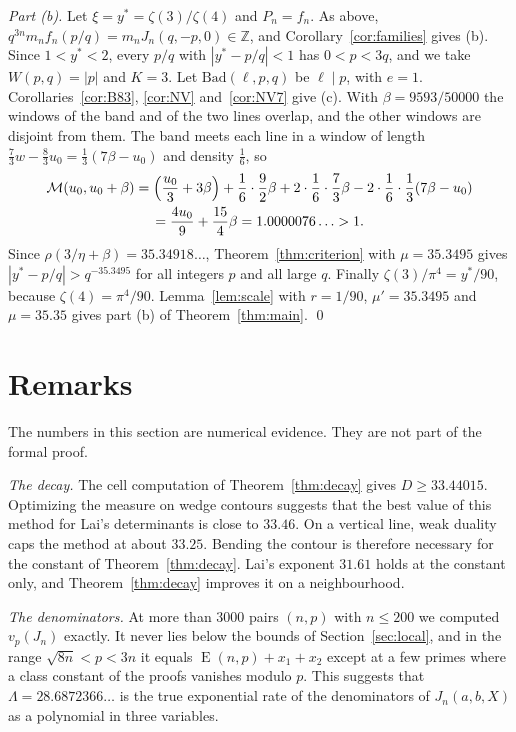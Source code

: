 \documentclass[11pt]{amsart}
\theoremstyle{definition}
\theoremstyle{remark}
\numberwithin{equation}{section}
\newcommand{\Z}{\mathbb Z}
\newcommand{\cM}{\mathcal M}
\newcommand{\Lex}{\operatorname{E}}
\begin{document}
\emph{Part (b).} Let $\xi=y^*=\zeta(3)/\zeta(4)$ and $P_n=f_n$. As above,
$q^{3n}m_nf_n(p/q)=m_nJ_n(q,-p,0)\in\Z$, and Corollary~\ref{cor:families} gives (b). Since $1<y^*<2$, every $p/q$
with $|y^*-p/q|<1$ has $0<p<3q$, and we take $W(p,q)=|p|$ and $K=3$. Let $\mathrm{Bad}(\ell,p,q)$ be $\ell\mid p$, with
$e=1$. Corollaries~\ref{cor:B83}, \ref{cor:NV} and~\ref{cor:NV7} give (c). With $\beta=9593/50000$ the windows of the band and of the
two lines overlap, and the other windows are disjoint from them. The band meets each line in a window of length $\frac73w-\frac83u_0=\frac13(7\beta-u_0)$ and
density $\frac16$, so
\begin{multline*}
 \cM(u_0,u_0+\beta)=\Bigl(\frac{u_0}3+3\beta\Bigr)+\frac16\cdot\frac92\beta+2\cdot\frac16\cdot\frac73\beta-2\cdot\frac16\cdot\frac13(7\beta-u_0)\\
 =\frac{4u_0}9+\frac{15}4\beta=1.0000076\ldots>1 .
\end{multline*}
Since $\rho(3/\eta+\beta)=35.34918\ldots$, Theorem~\ref{thm:criterion} with $\mu=35.3495$ gives
$|y^*-p/q|>q^{-35.3495}$ for all integers $p$ and all large $q$.
Finally $\zeta(3)/\pi^4=y^*/90$, because $\zeta(4)=\pi^4/90$. Lemma~\ref{lem:scale} with $r=1/90$, $\mu'=35.3495$
and $\mu=35.35$ gives part (b) of Theorem~\ref{thm:main}. \qed

\section{Remarks}\label{sec:remarks}

The numbers in this section are numerical evidence. They are not part of the formal proof.

\emph{The decay.} The cell computation of Theorem~\ref{thm:decay} gives $D\ge33.44015$. Optimizing the measure on wedge
contours suggests that the best value of this method for Lai's determinants is close to $33.46$. On a vertical line,
weak duality caps the method at about $33.25$. Bending the contour is therefore necessary for the constant of
Theorem~\ref{thm:decay}. Lai's exponent $31.61$ holds at the constant only, and Theorem~\ref{thm:decay} improves it
on a neighbourhood.

\emph{The denominators.} At more than $3000$ pairs $(n,p)$ with $n\le200$ we computed $v_p(J_n)$ exactly. It never lies
below the bounds of Section~\ref{sec:local}, and in the range $\sqrt{8n}<p<3n$ it equals $\Lex(n,p)+x_1+x_2$ except at a
few primes where a class constant of the proofs vanishes modulo $p$. This suggests that $\Lambda=28.6872366\ldots$ is
the true exponential rate of the denominators of $J_n(a,b,X)$ as a polynomial in three variables.
\end{document}
